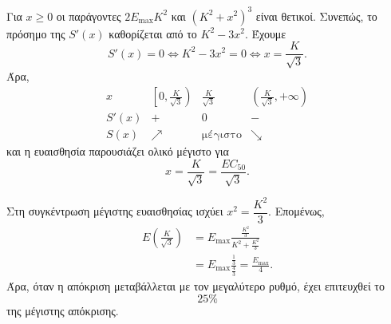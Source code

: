 \begin{alist}
        Για $x\geq0$ οι παράγοντες
        $2E_{\max}K^2$ και $(K^2+x^2)^3$ είναι θετικοί. Συνεπώς, το
        πρόσημο της $S'(x)$ καθορίζεται από το $K^2-3x^2$. Έχουμε
        \[
          S'(x)=0
          \Longleftrightarrow
          K^2-3x^2=0
          \Longleftrightarrow
          x=\frac{K}{\sqrt3}.
        \]
        Άρα,
        \[
        \begin{array}{c|ccc}
          x & \left[0,\frac{K}{\sqrt3}\right)
            & \frac{K}{\sqrt3}
            & \left(\frac{K}{\sqrt3},+\infty\right)\\ \hline
          S'(x) & + & 0 & -\\
          S(x) & \nearrow & \text{μέγιστο} & \searrow
        \end{array}
        \]
        και η ευαισθησία παρουσιάζει ολικό μέγιστο για
        \[
          {x=\frac{K}{\sqrt3}
          =\frac{EC_{50}}{\sqrt3}}.
        \]

  \item Στη συγκέντρωση μέγιστης ευαισθησίας ισχύει
        $x^2=\dfrac{K^2}{3}$. Επομένως,
        \begin{align*}
          E\left(\frac{K}{\sqrt3}\right)
          &=E_{\max}
            \frac{\frac{K^2}{3}}
                 {K^2+\frac{K^2}{3}}\\
          &=E_{\max}
            \frac{\frac13}{\frac43}
            =\frac{E_{\max}}{4}.
        \end{align*}
        Άρα, όταν η απόκριση μεταβάλλεται με τον μεγαλύτερο ρυθμό, έχει
        επιτευχθεί το
        \[
          {25\%}
        \]
        της μέγιστης απόκρισης.
\end{alist}
